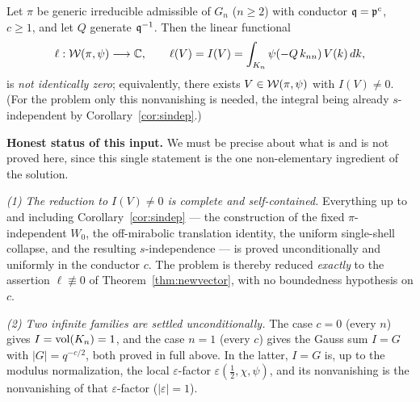\begin{qtwotheorem}\label{thm:newvector}
Let $\pi$ be generic irreducible admissible of $G_n$ \textup{(}$n\ge2$\textup{)} with conductor
$\mathfrak{q}=\mathfrak{p}^{c}$, $c\ge1$, and let $Q$ generate $\mathfrak{q}^{-1}$. Then the linear functional
\[
\ell:\mathcal{W}(\pi,\psi)\longrightarrow\mathbb{C},\qquad
\ell(V)=I(V)=\int_{K_n}\psi(-Q\,k_{nn})\,V(k)\,dk,
\]
is \emph{not identically zero}\textup{;} equivalently, there exists $V\in\mathcal{W}(\pi,\psi)$ with
$I(V)\ne0$. \textup{(}For the problem only this nonvanishing is needed, the integral being already
$s$-independent by Corollary~\ref{cor:sindep}.\textup{)}
\end{qtwotheorem}

\noindent\textbf{Honest status of this input.} We must be precise about what is and is not proved
here, since this single statement is the one non-elementary ingredient of the solution.

\smallskip
\noindent\emph{(1) The reduction to $I(V)\ne0$ is complete and self-contained.} Everything up to and
including Corollary~\ref{cor:sindep} --- the construction of the fixed $\pi$-independent
$W_0$, the off-mirabolic translation identity, the uniform single-shell collapse, and the
resulting $s$-independence --- is proved unconditionally and uniformly in the conductor $c$. The
problem is thereby reduced \emph{exactly} to the assertion $\ell\not\equiv0$ of
Theorem~\ref{thm:newvector}, with no boundedness hypothesis on $c$.

\smallskip
\noindent\emph{(2) Two infinite families are settled unconditionally.} The case $c=0$
\textup{(}every $n$\textup{)} gives $I=\operatorname{vol}(K_n)=1$, and the case $n=1$ \textup{(}every
$c$\textup{)} gives the Gauss sum $I=G$ with $|G|=q^{-c/2}$, both proved in full above. In the
latter, $I=G$ is, up to the modulus normalization, the local $\varepsilon$-factor
$\varepsilon(\tfrac12,\chi,\psi)$, and its nonvanishing is the nonvanishing of that
$\varepsilon$-factor \textup{(}$|\varepsilon|=1$\textup{)}.

